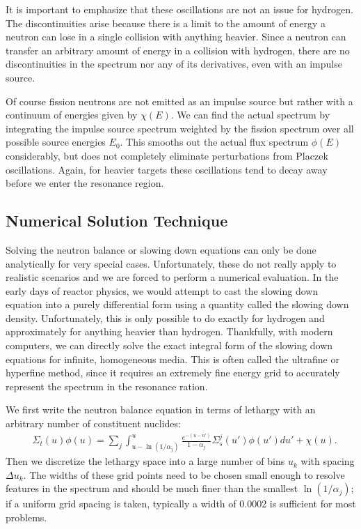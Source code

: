 It is important to emphasize that these oscillations are not an issue for hydrogen. The discontinuities arise because there is a limit to the amount of energy a neutron can lose in a single collision with anything heavier. Since a neutron can transfer an arbitrary amount of energy in a collision with hydrogen, there are no discontinuities in the spectrum nor any of its derivatives, even with an impulse source.

Of course fission neutrons are not emitted as an impulse source but rather with a continuum of energies given by $\chi(E)$. We can find the actual spectrum by integrating the impulse source spectrum weighted by the fission spectrum over all possible source energies $E_0$. This smooths out the actual flux spectrum $\phi(E)$ considerably, but does not completely eliminate perturbations from Placzek oscillations. Again, for heavier targets these oscillations tend to decay away before we enter the resonance region.

\subsection{Numerical Solution Technique}

Solving the neutron balance or slowing down equations can only be done analytically for very special cases. Unfortunately, these do not really apply to realistic scenarios and we are forced to perform a numerical evaluation. In the early days of reactor physics, we would attempt to cast the slowing down equation into a purely differential form using a quantity called the slowing down density. Unfortunately, this is only possible to do exactly for hydrogen and approximately for anything heavier than hydrogen. Thankfully, with modern computers, we can directly solve the exact integral form of the slowing down equations for infinite, homogeneous media. This is often called the ultrafine or hyperfine method, since it requires an extremely fine energy grid to accurately represent the spectrum in the resonance ration.

We first write the neutron balance equation in terms of lethargy with an arbitrary number of constituent nuclides:
\begin{align}
  &\Sigma_t(u) \phi(u)  
  = \sum_j \int_{u-\ln(1/\alpha_j)}^u  \frac{ e^{-(u - u')} }{ 1 - \alpha_j } \Sigma_s^j(u') \phi(u') du' + \chi(u) .
\end{align}
Then we discretize the lethargy space into a large number of bins $u_k$ with spacing $\Delta u_k$. The widths of these grid points need to be chosen small enough to resolve features in the spectrum and should be much finer than the smallest $\ln(1/\alpha_j)$; if a uniform grid spacing is taken, typically a width of 0.0002 is sufficient for most problems. 

